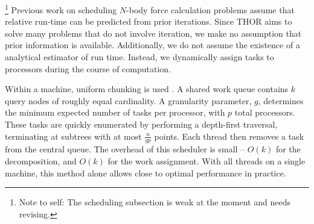 \documentclass[twoside,leqno,twocolumn]{article}
\newcommand{\authornote}[1]{\footnote{Note to self: #1}}
\newcommand{\authorsnote}[1]{\authornote{#1}}
\begin{document}
\authorsnote{The scheduling subsection is weak at the moment and needs revising.}
Previous work \cite{salmon_thesis, singh_thesis} on scheduling $N$-body force calculation problems assume that relative run-time can be predicted from prior iterations.
Since THOR aims to solve many problems that do not involve iteration, we make no assumption that prior information is available.
Additionally, we do not assume the existence of a analytical estimator of run time.
Instead, we dynamically assign tasks to processors during the course of computation.


Within a machine, uniform chunking is used \cite{uniform_chunking}.
A shared work queue contains $k$ query nodes of roughly equal cardinality.
A granularity parameter, $g$, determines the minimum expected number of tasks per processor, with $p$ total processors.
These tasks are quickly enumerated by performing a depth-first traversal, terminating at subtrees with at most $\frac{n}{gp}$ points.
Each thread then removes a task from the central queue.
The overhead of this scheduler is small -- $O(k)$ for the decomposition, and $O(k)$ for the work assignment.
With all threads on a single machine, this method alone allows close to optimal performance in practice.
\end{document}
